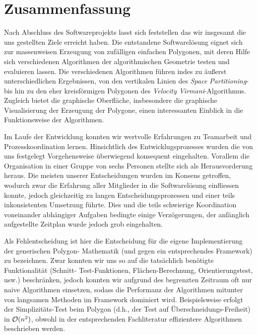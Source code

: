 \section{Zusammenfassung}

  Nach Abschluss des Softwareprojekts lasst sich feststellen das wir insgesamt 
  die uns gestellten Ziele erreicht haben.
  Die entstandene Softwarelösung eignet sich zur
  massenweisen Erzeugung von zufälligen einfachen Polygonen, mit deren Hilfe
  sich verschiedenen Algorithmen der algorithmischen Geometrie testen und
  evaluieren lassen. Die verschiedenen Algorithmen führen indes zu äußerst
  unterschiedlichen Ergebnissen, von den vertikalen Linien des \emph{Space
  Partitioning}- bis hin zu den eher kreisförmigen Polygonen des
  \emph{Velocity Virmani}-Algorithmus. Zugleich bietet die graphische
  Oberfläche, insbesondere die graphische Visualisierung der Erzeugung der
  Polygone, einen interessanten Einblick in die Funktionsweise der
  Algorithmen.

  Im Laufe der Entwicklung konnten wir wertvolle Erfahrungen zu Teamarbeit und
  Prozesskoordination lernen. Hinsichtlich des Entwicklugsprozesses wurden die
  von uns festgelegt Vorgehensweise überwiegend konsequent eingehalten. Vorallem
  die Organisation in einer Gruppe von sechs Personen stellte sich als
  Herausvorderung heraus. Die meisten unserer Entscheidungen wurden im Konsens
  getroffen, wodurch zwar die Erfahrung aller Mitglieder in die Softwarelösung
  einfliessen konnte, jedoch gleichzeitig zu langen Entscheidungsprozessen und
  einer teils inkonsistenten Umsetzung führte. Dies und die teils schwierige
  Koordination voneinander abhängiger Aufgaben bedingte einige Verzögerungen,
  der anfänglich aufgestellte Zeitplan wurde jedoch grob eingehalten.

  Als Fehlentscheidung ist hier die
  Entscheidung für die eigene Implementierung der generischen Polygon-
  Mathematik (und gegen ein entsprechendes Framework) zu bezeichnen. Zwar
  konnten wir uns so auf die tatsächlich benötigte Funktionalität (Schnitt-
  Test-Funktionen, Flächen-Berechnung, Orientierungstest, usw.) beschränken,
  jedoch konnten wir aufgrund des begrenzten Zeitraum oft nur naive
  Algorithmen einsetzen, sodass die Performanz der Algorithmen mitunter von
  langsamen Methoden im Framework dominiert wird. Beispielsweise erfolgt der
  Simplizitäts-Test beim Polygon (d.h., der Test auf Überschneidungs-Freiheit)
  in $\mathcal{O}(n^2)$, obwohl in der entsprechenden Fachliteratur effizientere
  Algorithmen beschrieben werden.

